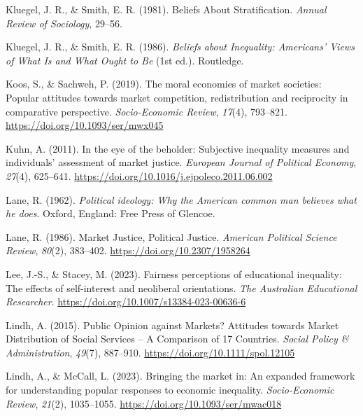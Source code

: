 \documentclass[
  12pt,
]{article}
\newlength{\cslhangindent}
\newenvironment{CSLReferences}[2] %
 {\begin{list}{}{%
  \setlength{\itemindent}{0pt}
  \setlength{\leftmargin}{0pt}
  \setlength{\parsep}{0pt}
  \ifodd #1
   \setlength{\leftmargin}{\cslhangindent}
   \setlength{\itemindent}{-1\cslhangindent}
  \fi
  \setlength{\itemsep}{#2\baselineskip}}}
 {\end{list}}
\begin{document}
\begin{CSLReferences}{1}{0}
Kluegel, J. R., \& Smith, E. R. (1981). Beliefs {About Stratification}.
\emph{Annual Review of Sociology}, 29--56.

Kluegel, J. R., \& Smith, E. R. (1986). \emph{Beliefs about
{Inequality}: {Americans}' {Views} of {What Is} and {What Ought} to
{Be}} (1st ed.). Routledge.

Koos, S., \& Sachweh, P. (2019). The moral economies of market
societies: Popular attitudes towards market competition, redistribution
and reciprocity in comparative perspective. \emph{Socio-Economic
Review}, \emph{17}(4), 793--821.
\url{https://doi.org/10.1093/ser/mwx045}

Kuhn, A. (2011). In the eye of the beholder: {Subjective} inequality
measures and individuals' assessment of market justice. \emph{European
Journal of Political Economy}, \emph{27}(4), 625--641.
\url{https://doi.org/10.1016/j.ejpoleco.2011.06.002}

Lane, R. (1962). \emph{Political ideology: Why the {American} common man
believes what he does}. Oxford, England: Free Press of Glencoe.

Lane, R. (1986). Market {Justice}, {Political Justice}. \emph{American
Political Science Review}, \emph{80}(2), 383--402.
\url{https://doi.org/10.2307/1958264}

Lee, J.-S., \& Stacey, M. (2023). Fairness perceptions of educational
inequality: The effects of self-interest and neoliberal orientations.
\emph{The Australian Educational Researcher}.
\url{https://doi.org/10.1007/s13384-023-00636-6}

Lindh, A. (2015). Public {Opinion} against {Markets}? {Attitudes}
towards {Market Distribution} of {Social Services} -- {A Comparison} of
17 {Countries}. \emph{Social Policy \& Administration}, \emph{49}(7),
887--910. \url{https://doi.org/10.1111/spol.12105}

Lindh, A., \& McCall, L. (2023). Bringing the market in: An expanded
framework for understanding popular responses to economic inequality.
\emph{Socio-Economic Review}, \emph{21}(2), 1035--1055.
\url{https://doi.org/10.1093/ser/mwac018}


\end{CSLReferences}
\end{document}
